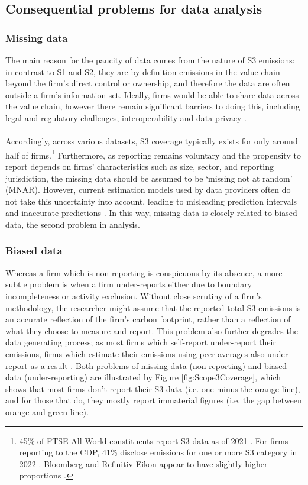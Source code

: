 \documentclass[12pt,twoside]{report}
\begin{document}
\subsection{Consequential problems for data analysis}
\subsubsection{Missing data}
The main reason for the paucity of data comes from the nature of S3 emissions: in contrast to S1 and S2, they are by definition emissions in the value chain beyond the firm's direct control or ownership, and therefore the data are often outside a firm's information set. Ideally, firms would be able to share data across the value chain, however there remain significant barriers to doing this, including legal and regulatory challenges, interoperability and data privacy \cite{StenzelWaichman2023}. 
\\\\
Accordingly, across various datasets, S3 coverage typically exists for only around half of firms.\footnote{45\% of FTSE All-World constituents report S3 data as of 2021 \cite{ftserussell2024}. For firms reporting to the CDP, 41\%  disclose emissions for one or more S3 category in 2022 \cite{cdp2023}. Bloomberg and Refinitiv Eikon appear to have slightly higher proportions \cite{Nguyenetal2023}.} Furthermore, as reporting remains voluntary and the propensity to report depends on firms' characteristics such as size, sector, and reporting jurisdiction, the missing data should be assumed to be `missing not at random' (MNAR). However, current estimation models used by data providers often do not take this uncertainty into account, leading to misleading prediction intervals and inaccurate predictions \cite{olesiewicz2021}. In this way, missing data is closely related to biased data, the second problem in analysis. 

\subsubsection{Biased data}
Whereas a firm which is non-reporting is conspicuous by its absence, a more subtle problem is when a firm under-reports either due to boundary incompleteness or activity exclusion. Without close scrutiny of a firm's methodology, the researcher might assume that the reported total S3 emissions is an accurate reflection of the firm's carbon footprint, rather than a reflection of what they choose to measure and report. This problem also further degrades the data generating process; as most firms which self-report under-report their emissions, firms which estimate their emissions using peer averages also under-report as a result \cite{Hoepner2021}. Both problems of missing data (non-reporting) and biased data (under-reporting) are illustrated by Figure \ref{fig:Scope3Coverage}, which shows that most firms don't report their S3 data (i.e. one minus the orange line), and for those that do, they mostly report immaterial figures (i.e. the gap between orange and green line). 
\end{document}
